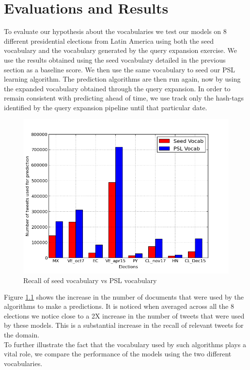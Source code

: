 \chapter{Evaluations and Results}
To evaluate our hypothesis about the vocabularies we test our models on 8 different presidential elections from Latin America using both the seed vocabulary and the vocabulary generated by the query expansion exercise.
We use the results obtained using the seed vocabulary detailed in the previous section as a baseline score.
We then use the same vocabulary to seed our PSL learning algorithm. 
The prediction algorithms are then run again, now by using the expanded vocabulary obtained through the query expansion.
In order to remain consistent with predicting ahead of time, we use track only the hash-tags identified by the query expansion pipeline  until that particular date.
\begin{figure}[Ht]
	\centering
	\includegraphics[scale=0.65]{support_files/Recall.png}
	\caption{Recall of seed vocabulary vs PSL vocabulary}
	\label{fig:recall}
\end{figure}
Figure \ref{fig:recall} shows the increase in the number of documents that were used by the algorithms to make a predictions.
It is noticed when averaged across all the 8 elections we notice close to a 2X increase in the number of tweets that were used by these models.
This is a substantial increase in the recall of relevant tweets for the domain.\\
To further illustrate the fact that the vocabulary used by such algorithms plays a vital role, we compare the performance of the models using the two different vocabularies.
